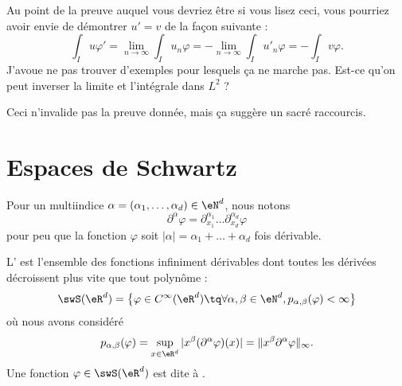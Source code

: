 \begin{probleme}    \label{ProbTOElufz}
    Au point de la preuve auquel vous devriez être si vous lisez ceci, vous pourriez avoir envie de démontrer \( u'=v\) de la façon suivante :
    \begin{equation}
        \int_I u\varphi'=\lim_{n\to \infty} \int_Iu_n\varphi=-\lim_{n\to \infty} \int_Iu'_n\varphi=-\int_Iv\varphi.
    \end{equation}
    J'avoue ne pas trouver d'exemples pour lesquels ça ne marche pas. Est-ce qu'on peut inverser la limite et l'intégrale dans \( L^2\) ?

    Ceci n'invalide pas la preuve donnée, mais ça suggère un sacré raccourcis.
\end{probleme}

\section{Espaces de Schwartz}

Pour un multiindice \( \alpha=(\alpha_1,\ldots, \alpha_d)\in \eN^d\), nous notons
\begin{equation}
    \partial^{\alpha}\varphi=\partial_{x_1}^{\alpha_1}\ldots\partial_{x_d}^{\alpha_d}\varphi
\end{equation}
pour peu que la fonction \( \varphi\) soit \( | \alpha |=\alpha_1+\ldots +\alpha_d\) fois dérivable.

\begin{definition}
    L' est l'ensemble des fonctions infiniment dérivables dont toutes les dérivées décroissent plus vite que tout polynôme :
    \begin{equation}
        \swS(\eR^d)=\big\{   \varphi\in C^{\infty}(\eR^d)\tq\forall \alpha,\beta\in \eN^d, p_{\alpha,\beta}(\varphi)<\infty   \big\}
    \end{equation}
    où nous avons considéré
    \begin{equation}
        p_{\alpha,\beta}(\varphi)=\sup_{x\in \eR^d}| x^{\beta}(\partial^{\alpha}\varphi)(x) |=\| x^{\beta}\partial^{\alpha}\varphi \|_{\infty}.
    \end{equation}
    Une fonction \( \varphi\in\swS(\eR^d)\) est dite à .
\end{definition}

